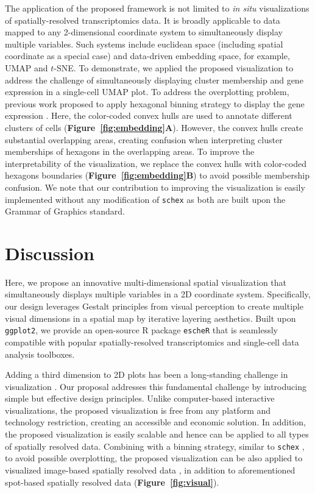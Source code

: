 \documentclass[10pt,twocolumn]{article}
\begin{document}
The application of the proposed framework is not limited to \textit{in situ} visualizations of spatially-resolved transcriptomics data. It is broadly applicable to data mapped to any 2-dimensional coordinate system to simultaneously display multiple variables. Such systems include euclidean space (including spatial coordinate as a special case) and data-driven embedding space, for example, UMAP and $t$-SNE. To demonstrate, we applied the proposed visualization to address the challenge of simultaneously displaying cluster membership and gene expression in a single-cell UMAP plot. To address the overplotting problem, previous work proposed to apply hexagonal binning strategy to display the gene expression \cite{freytag_2020}. Here, the color-coded convex hulls are used to annotate different clusters of cells (\textbf{Figure~\ref{fig:embedding}A}). However, the convex hulls create substantial overlapping areas, creating confusion when interpreting cluster memberships of hexagons in the overlapping areas. To improve the interpretability of the visualization, we replace the convex hulls with color-coded hexagons boundaries  (\textbf{Figure~\ref{fig:embedding}B}) to avoid possible membership confusion. We note that our contribution to improving the visualization is easily implemented without any modification of \texttt{schex} as both are built upon the Grammar of Graphics \cite{wilkinson_2012} standard.


\section{Discussion}
Here, we propose an innovative multi-dimensional spatial visualization that simultaneously displays multiple variables in a 2D coordinate system. Specifically, our design leverages Gestalt principles from visual perception to create multiple visual dimensions in a spatial map by iterative layering aesthetics. Built upon \texttt{ggplot2}, we provide an open-source R package \texttt{escheR} that is seamlessly compatible with popular spatially-resolved transcriptomics and single-cell data analysis toolboxes. 

Adding a third dimension to 2D plots has been a long-standing challenge in visualization \cite{odonoghue_2010}. Our proposal addresses this fundamental challenge by introducing simple but effective design principles. Unlike computer-based interactive visualizations, the proposed visualization is free from any platform and technology restriction, creating an accessible and economic solution. In addition, the proposed visualization is easily scalable and hence can be applied to all types of spatially resolved data. Combining with a binning strategy, similar to \texttt{schex} \cite{freytag_2020}, to avoid possible overplotting, the proposed visualization can be also applied to visualized image-based spatially resolved data \cite{caicedo_2017}, in addition to aforementioned spot-based spatially resolved data (\textbf{Figure~\ref{fig:visual}}).  
\end{document}
